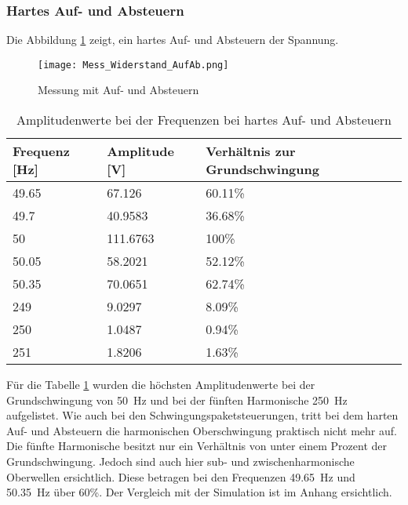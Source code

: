 \newpage
\subsubsection*{Hartes Auf- und Absteuern}
Die Abbildung \ref{fig:Mess_Sanft} zeigt, ein hartes Auf- und Absteuern der Spannung.

\begin{figure}[ht!]
	\centering
	\texttt{[image: Mess\_Widerstand\_AufAb.png]}	
	\caption{Messung mit Auf- und Absteuern}\label{fig:Mess_Sanft}
\end{figure}


\begin{table}[ht!]
	\centering
	\begin{tabular}{|l|l|l|}
		\hline
		Frequenz {[}Hz{]} & Amplitude {[}V{]} & Verhältnis zur Grundschwingung \\ \hline
		49.65             & 67.126            & 60.11\%                        \\ \hline
		49.7              & 40.9583           & 36.68\%                        \\ \hline
		50                & 111.6763          & 100\%                          \\ \hline
		50.05             & 58.2021           & 52.12\%                        \\ \hline
		50.35             & 70.0651           & 62.74\%                        \\ \hline
		249               & 9.0297            & 8.09\%                         \\ \hline
		250               & 1.0487            & 0.94\%                         \\ \hline
		251 		      & 1.8206            & 1.63\%                         \\ \hline
	\end{tabular}
\caption{Amplitudenwerte bei der Frequenzen bei hartes Auf- und Absteuern}\label{tab:Mess_Spannung_AufAb_hart}
\end{table}

Für die Tabelle \ref{tab:Mess_Spannung_AufAb_hart} wurden die höchsten Amplitudenwerte bei der Grundschwingung von \SI{50}{Hz} und bei der fünften Harmonische \SI{250}{Hz} aufgelistet.
Wie auch bei den Schwingungspaketsteuerungen, tritt bei dem harten Auf- und Absteuern die harmonischen Oberschwingung praktisch nicht mehr auf. Die fünfte Harmonische besitzt nur ein Verhältnis von unter einem Prozent der Grundschwingung. Jedoch sind auch hier sub- und zwischenharmonische Oberwellen ersichtlich. Diese betragen bei den Frequenzen \SI{49.65}{Hz} und \SI{50.35}{Hz} über 60\%. Der Vergleich mit der Simulation ist im Anhang ersichtlich.

